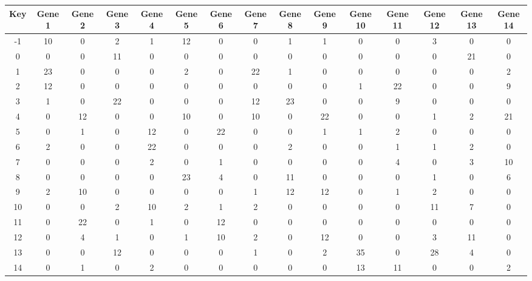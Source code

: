 \begin{tabular}{|c|c|c|c|c|c|c|c|c|c|c|c|c|c|c|}
\hline
Key & Gene 1 & Gene 2 & Gene 3 & Gene 4 & Gene 5 & Gene 6 & Gene 7 & Gene 8 & Gene 9 & Gene 10 & Gene 11 & Gene 12 & Gene 13 & Gene 14 \\
\hline
-1 & 10 & 0 & 2 & 1 & 12 & 0 & 0 & 1 & 1 & 0 & 0 & 3 & 0 & 0 \\
0 & 0 & 0 & 11 & 0 & 0 & 0 & 0 & 0 & 0 & 0 & 0 & 0 & 21 & 0 \\
1 & 23 & 0 & 0 & 0 & 2 & 0 & 22 & 1 & 0 & 0 & 0 & 0 & 0 & 2 \\
2 & 12 & 0 & 0 & 0 & 0 & 0 & 0 & 0 & 0 & 1 & 22 & 0 & 0 & 9 \\
3 & 1 & 0 & 22 & 0 & 0 & 0 & 12 & 23 & 0 & 0 & 9 & 0 & 0 & 0 \\
4 & 0 & 12 & 0 & 0 & 10 & 0 & 10 & 0 & 22 & 0 & 0 & 1 & 2 & 21 \\
5 & 0 & 1 & 0 & 12 & 0 & 22 & 0 & 0 & 1 & 1 & 2 & 0 & 0 & 0 \\
6 & 2 & 0 & 0 & 22 & 0 & 0 & 0 & 2 & 0 & 0 & 1 & 1 & 2 & 0 \\
7 & 0 & 0 & 0 & 2 & 0 & 1 & 0 & 0 & 0 & 0 & 4 & 0 & 3 & 10 \\
8 & 0 & 0 & 0 & 0 & 23 & 4 & 0 & 11 & 0 & 0 & 0 & 1 & 0 & 6 \\
9 & 2 & 10 & 0 & 0 & 0 & 0 & 1 & 12 & 12 & 0 & 1 & 2 & 0 & 0 \\
10 & 0 & 0 & 2 & 10 & 2 & 1 & 2 & 0 & 0 & 0 & 0 & 11 & 7 & 0 \\
11 & 0 & 22 & 0 & 1 & 0 & 12 & 0 & 0 & 0 & 0 & 0 & 0 & 0 & 0 \\
12 & 0 & 4 & 1 & 0 & 1 & 10 & 2 & 0 & 12 & 0 & 0 & 3 & 11 & 0 \\
13 & 0 & 0 & 12 & 0 & 0 & 0 & 1 & 0 & 2 & 35 & 0 & 28 & 4 & 0 \\
14 & 0 & 1 & 0 & 2 & 0 & 0 & 0 & 0 & 0 & 13 & 11 & 0 & 0 & 2 \\
\hline
\end{tabular}